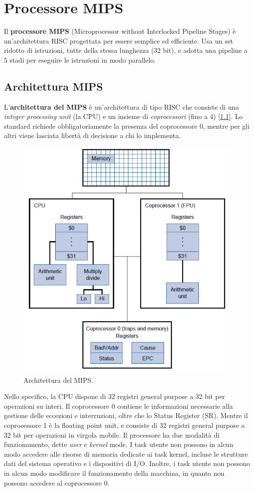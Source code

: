 \chapter{Processore MIPS}
Il \textbf{processore MIPS} (Microprocessor without Interlocked Pipeline Stages) è un'architettura RISC progettata per essere semplice ed efficiente. Usa un set ridotto di istruzioni, tutte della stessa lunghezza (32 bit), e adotta una pipeline a 5 stadi per eseguire le istruzioni in modo parallelo.

\section{Architettura MIPS} \label{sec:mips}
L'\textbf{architettura del MIPS} è un'architettura di tipo RISC che consiste di una \textit{integer processing unit} (la CPU) e un insieme di \textit{coprocessori} (fino a 4) [\ref{fig:mips_arc}]. Lo standard richiede obbligatoriamente la presenza del coprocessore 0, mentre per gli altri viene lasciata libertà di decisione a chi lo implementa.
\begin{figure}[!h]
    \centering
    \includegraphics[width=0.45\linewidth]{img/mips.png}
    \caption{Architettura del MIPS.}
    \label{fig:mips_arc}
\end{figure}
Nello specifico, la CPU dispone di 32 registri general purpose a 32 bit per operazioni su interi. Il coprocessore 0 contiene le informazioni necessarie alla gestione delle eccezioni e interruzioni, oltre che lo Status Register (SR). Mentre il coprocessore 1 è la floating point unit, e consiste di 32 registri general purpose a 32 bit per operazioni in virgola mobile. Il processore ha due modalità di funzionamento, dette \textit{user} e \textit{kernel} mode. I task utente non possono in alcun modo accedere alle risorse di memoria dedicate ai task kernel, incluse le strutture dati del sistema operativo e i dispositivi di I/O. Inoltre, i task utente non possono in alcun modo modificare il funzionamento della macchina, in quanto non possono accedere al coprocessore 0.
